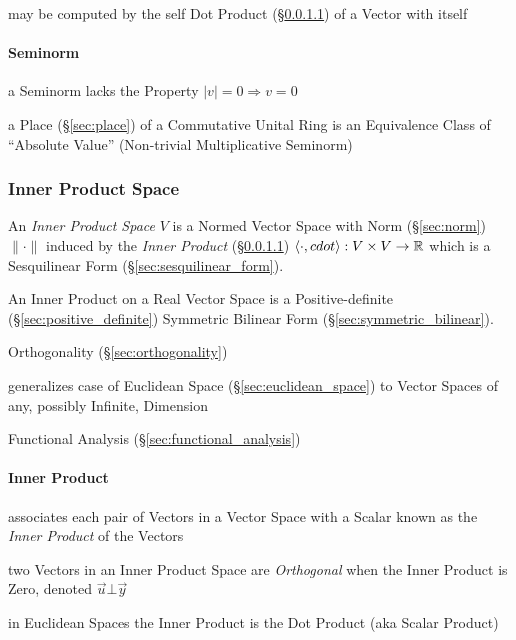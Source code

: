 may be computed by the self Dot Product (\S\ref{sec:inner_product}) of a Vector
with itself



\paragraph{Seminorm}\label{sec:seminorm}\hfill

a Seminorm lacks the Property $|v| = 0 \Longrightarrow v = 0$

\fist a Place (\S\ref{sec:place}) of a Commutative Unital Ring is an
Equivalence Class of ``Absolute Value'' (Non-trivial Multiplicative Seminorm)



\subsubsection{Inner Product Space}\label{sec:innerproduct_space}

An \emph{Inner Product Space} $V$ is a Normed Vector Space with Norm
(\S\ref{sec:norm}) $\|\cdot\|$ induced by the \emph{Inner Product}
(\S\ref{sec:inner_product}) $\langle{\cdot,cdot}\rangle : V \times V
\rightarrow \mathbb{R}$ which is a Sesquilinear Form
(\S\ref{sec:sesquilinear_form}).

An Inner Product on a Real Vector Space is a Positive-definite
(\S\ref{sec:positive_definite}) Symmetric Bilinear Form
(\S\ref{sec:symmetric_bilinear}).

\fist Orthogonality (\S\ref{sec:orthogonality})

generalizes case of Euclidean Space (\S\ref{sec:euclidean_space}) to
Vector Spaces of any, possibly Infinite, Dimension

Functional Analysis (\S\ref{sec:functional_analysis})



\paragraph{Inner Product}\label{sec:inner_product}\hfill

associates each pair of Vectors in a Vector Space with a Scalar known
as the \emph{Inner Product} of the Vectors

two Vectors in an Inner Product Space are \emph{Orthogonal} when the Inner
Product is Zero, denoted $\vec{u} \bot \vec{y}$

in Euclidean Spaces the Inner Product is the Dot Product (aka Scalar Product)

